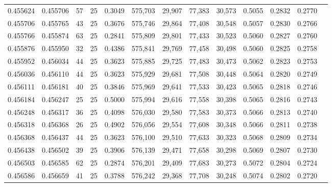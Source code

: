 \begin{tabular}{rrrrrrrrrrrrr}
0.455624 & 0.455706 &    57 &  25 &                                     0.3049 & 575,703 &  29,907 &  77,383 &  30,573 & 0.5055 & 0.2832 & 0.2770 \\
0.455706 & 0.455765 &    43 &  25 &                                     0.3676 & 575,746 &  29,864 &  77,408 &  30,548 & 0.5057 & 0.2830 & 0.2766 \\
0.455766 & 0.455874 &    63 &  25 &                                     0.2841 & 575,809 &  29,801 &  77,433 &  30,523 & 0.5060 & 0.2827 & 0.2760 \\
0.455876 & 0.455950 &    32 &  25 &                                     0.4386 & 575,841 &  29,769 &  77,458 &  30,498 & 0.5060 & 0.2825 & 0.2758 \\
0.455952 & 0.456034 &    44 &  25 &                                     0.3623 & 575,885 &  29,725 &  77,483 &  30,473 & 0.5062 & 0.2823 & 0.2753 \\
0.456036 & 0.456110 &    44 &  25 &                                     0.3623 & 575,929 &  29,681 &  77,508 &  30,448 & 0.5064 & 0.2820 & 0.2749 \\
0.456111 & 0.456181 &    40 &  25 &                                     0.3846 & 575,969 &  29,641 &  77,533 &  30,423 & 0.5065 & 0.2818 & 0.2746 \\
0.456184 & 0.456247 &    25 &  25 &                                     0.5000 & 575,994 &  29,616 &  77,558 &  30,398 & 0.5065 & 0.2816 & 0.2743 \\
0.456248 & 0.456317 &    36 &  25 &                                     0.4098 & 576,030 &  29,580 &  77,583 &  30,373 & 0.5066 & 0.2813 & 0.2740 \\
0.456318 & 0.456368 &    26 &  25 &                                     0.4902 & 576,056 &  29,554 &  77,608 &  30,348 & 0.5066 & 0.2811 & 0.2738 \\
0.456368 & 0.456437 &    44 &  25 &                                     0.3623 & 576,100 &  29,510 &  77,633 &  30,323 & 0.5068 & 0.2809 & 0.2734 \\
0.456438 & 0.456502 &    39 &  25 &                                     0.3906 & 576,139 &  29,471 &  77,658 &  30,298 & 0.5069 & 0.2807 & 0.2730 \\
0.456503 & 0.456585 &    62 &  25 &                                     0.2874 & 576,201 &  29,409 &  77,683 &  30,273 & 0.5072 & 0.2804 & 0.2724 \\
0.456586 & 0.456659 &    41 &  25 &                                     0.3788 & 576,242 &  29,368 &  77,708 &  30,248 & 0.5074 & 0.2802 & 0.2720 \\

\end{tabular}
